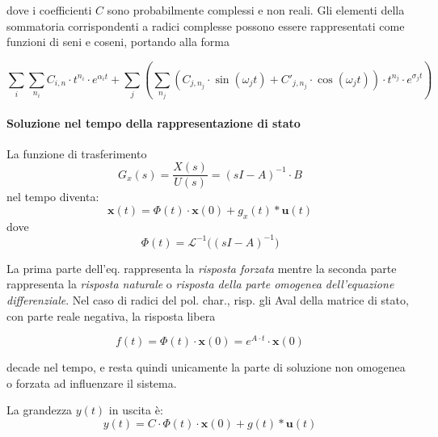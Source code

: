 \documentclass[11pt]{article}
\begin{document}
    dove i coefficienti \(C\) sono probabilmente complessi e non reali. Gli
elementi della sommatoria corrispondenti a radici complesse possono
essere rappresentati come funzioni di seni e coseni, portando alla forma

\begin{equation}
    \sum_i \sum_{n_i} C_{i,n} \cdot t^{n_i} \cdot e^{\alpha_i t} + \sum_j ( \sum_{n_j}(C_{j,n_j} \cdot \sin(\omega_j t) + {C'}_{j,n_j} \cdot \cos(\omega_j t)) \cdot t^{n_j} \cdot e^{\sigma_j t})
\end{equation}

    \hypertarget{soluzione-nel-tempo-della-rappresentazione-di-stato}{%
\paragraph{Soluzione nel tempo della rappresentazione di
stato}\label{soluzione-nel-tempo-della-rappresentazione-di-stato}}

La funzione di trasferimento \begin{equation}
G_x(s) = \frac{X(s)}{U(s)} = (sI - A)^{-1} \cdot B
\end{equation} nel tempo diventa: \begin{equation}
\boldsymbol{x}(t) = \Phi(t) \cdot \boldsymbol{x}(0) + g_x(t) * \boldsymbol{u}(t)
\end{equation} dove \begin{equation}
\Phi(t) = \mathcal{L}^{-1}\big((sI - A)^{-1}\big)
\end{equation}

    La prima parte dell'eq. rappresenta la \emph{risposta forzata} mentre la
seconda parte rappresenta la \emph{risposta naturale} o \emph{risposta
della parte omogenea dell'equazione differenziale}. Nel caso di radici
del pol. char., risp. gli Aval della matrice di stato, con parte reale
negativa, la risposta libera

\begin{equation}
f(t) = \Phi(t) \cdot \boldsymbol{x}(0) = e^{A \cdot t} \cdot \boldsymbol{x}(0)
\end{equation}

decade nel tempo, e resta quindi unicamente la parte di soluzione non
omogenea o forzata ad influenzare il sistema.

La grandezza \(y(t)\) in uscita è: \begin{equation}
y(t) = C \cdot \Phi(t) \cdot \boldsymbol{x}(0) + g(t) * \boldsymbol{u}(t)
\end{equation}
\end{document}
